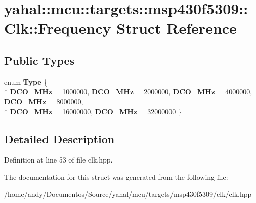 \hypertarget{structyahal_1_1mcu_1_1targets_1_1msp430f5309_1_1_clk_1_1_frequency}{}\section{yahal\+:\+:mcu\+:\+:targets\+:\+:msp430f5309\+:\+:Clk\+:\+:Frequency Struct Reference}
\label{structyahal_1_1mcu_1_1targets_1_1msp430f5309_1_1_clk_1_1_frequency}
\subsection*{Public Types}
\begin{DoxyCompactItemize}
\item 
\hypertarget{structyahal_1_1mcu_1_1targets_1_1msp430f5309_1_1_clk_1_1_frequency_a32962c9ff596c457b230044a7f209b26}{}enum {\bfseries Type} \{ \\*
{\bfseries D\+C\+O\+\_\+M\+Hz} = 1000000, 
{\bfseries D\+C\+O\+\_\+M\+Hz} = 2000000, 
{\bfseries D\+C\+O\+\_\+M\+Hz} = 4000000, 
{\bfseries D\+C\+O\+\_\+M\+Hz} = 8000000, 
\\*
{\bfseries D\+C\+O\+\_\+M\+Hz} = 16000000, 
{\bfseries D\+C\+O\+\_\+M\+Hz} = 32000000
 \}\label{structyahal_1_1mcu_1_1targets_1_1msp430f5309_1_1_clk_1_1_frequency_a32962c9ff596c457b230044a7f209b26}

\end{DoxyCompactItemize}


\subsection{Detailed Description}


Definition at line 53 of file clk.\+hpp.



The documentation for this struct was generated from the following file\+:\begin{DoxyCompactItemize}
\item 
/home/andy/\+Documentos/\+Source/yahal/mcu/targets/msp430f5309/clk/clk.\+hpp\end{DoxyCompactItemize}
